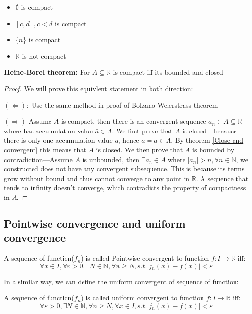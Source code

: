 \documentclass{article}
\newcommand{\N}{\mathbb{N}}
\newcommand{\R}{\mathbb{R}}
\begin{document}
\begin{itemize}
		\item $\emptyset$ is compact
		\item $[c,d],c<d$ is compact
		\item $\{n \}$ is compact
		\item $\R$ is not compact
\end{itemize}

\begin{theorem}\label{Heine-Borel theorem}
	\textbf{Heine-Borel theorem:} For $A\subseteq \R$ is compact iff its bounded and closed 
\end{theorem}

\begin{proof}
	We will prove this equivlent statement in both direction:
	
	$(\Leftarrow):$ Use the same method in proof of Bolzano-Welerstrass theorem

	$(\Rightarrow)$ Assume $A$ is compact, then there is an convergent sequence $a_n\in A\subseteq \R$ where has accumulation value $\bar{a}\in A$. We first prove that $A$ is closed---because there is only one accumulation value $a$, hence $\bar{a}=a\in A$. By theorem \ref{Close and convergent} this means that $A$ is closed. We then prove that $A$ is bounded by contradiction---Assume $A$ is unbounded, then $\exists a_n\in A$ where $|a_n|>n,\forall n\in \mathbb{N}$, we constructed does not have any convergent subsequence. This is because its terms grow without bound and thus cannot converge to any point in $\R$. A sequence that tends to infinity doesn't converge, which contradicts the property of compactness in $A$.



\end{proof}

\subsection{Pointwise convergence and uniform convergence}
\begin{definition}
   A sequence of function($f_n$) is called Pointwise convergent to function $f:I\to \R$ iff:
   \begin{equation*}
   	\forall \bar{x}\in I,\forall \varepsilon >0, \exists N\in \N , \forall n\geq N, s.t. |f_n(\bar{x})-f(\bar{x})|<\varepsilon
   \end{equation*}
\end{definition}

In a similar way, we can define the uniform convergent of sequence of function:
\begin{definition}
	A sequence of function($f_n$) is called uniform convergent to function $f:I\to \R$ iff:
   \begin{equation*}
   	\forall \varepsilon >0, \exists N\in \N , \forall n\geq N, \forall \bar{x}\in I, s.t. |f_n(\bar{x})-f(\bar{x})|<\varepsilon
   \end{equation*}
\end{definition}
\end{document}
